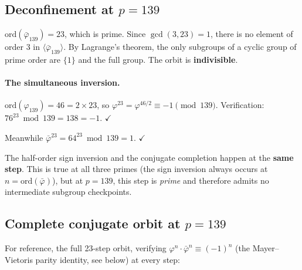 \subsection{Deconfinement at $p = 139$}

$\mathrm{ord}(\bar\varphi_{139}) = 23$, which is prime.
Since $\gcd(3, 23) = 1$, there is no element of order 3 in
$\langle\bar\varphi_{139}\rangle$. By Lagrange's theorem, the
only subgroups of a cyclic group of prime order are $\{1\}$ and
the full group. The orbit is \textbf{indivisible}.

\paragraph{The simultaneous inversion.}
$\mathrm{ord}(\varphi_{139}) = 46 = 2 \times 23$, so
$\varphi^{23} = \varphi^{46/2} \equiv -1 \pmod{139}$.
Verification: $76^{23} \bmod 139 = 138 = -1$. $\checkmark$

Meanwhile $\bar\varphi^{23} = 64^{23} \bmod 139 = 1$. $\checkmark$

The half-order sign inversion and the conjugate completion happen at the
\textbf{same step}. This is true at all three primes (the sign inversion
always occurs at $n = \mathrm{ord}(\bar\varphi)$), but at $p = 139$,
this step is \emph{prime} and therefore admits no intermediate
subgroup checkpoints.

\subsection{Complete conjugate orbit at $p = 139$}

For reference, the full 23-step orbit, verifying
$\varphi^n \cdot \bar\varphi^n \equiv (-1)^n$ (the Mayer--Vietoris
parity identity, see below) at every step:

